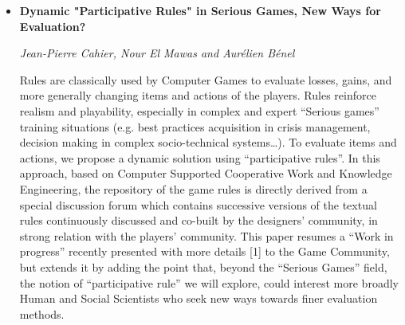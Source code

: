 \begin{itemize}
\item \textbf{Dynamic "Participative Rules" in Serious Games, New Ways for
Evaluation?}

\textit{Jean-Pierre Cahier, Nour El Mawas and Aurélien Bénel}

Rules are classically used by Computer Games to evaluate losses, gains, and more
generally changing items and actions of the players. Rules reinforce realism and
playability, especially in complex and expert “Serious games” training
situations (e.g. best practices acquisition in crisis management, decision
making in complex socio-technical systems…). To evaluate items and actions, we
propose a dynamic solution using “participative rules”. In this approach, based
on Computer Supported Cooperative Work and Knowledge Engineering, the repository
of the game rules is directly derived from a special discussion forum which
contains successive versions of the textual rules continuously discussed and
co-built by the designers’ community, in strong relation with the players’
community. This paper resumes a “Work in progress” recently presented with more
details [1] to the Game Community, but extends it by adding the point that,
beyond the “Serious Games” field, the notion of “participative rule” we will
explore, could interest more broadly Human and Social Scientists who seek new
ways towards finer evaluation methods.
\end{itemize}

